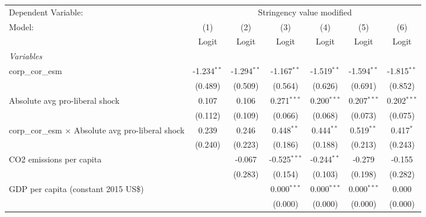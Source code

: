 
\begingroup
\centering
\begin{tabular}{lcccccc}
   \toprule
   Dependent Variable: & \multicolumn{6}{c}{Stringency value modified}\\
   Model:                                                    & (1)           & (2)           & (3)            & (4)           & (5)           & (6)\\  
                                                             &  Logit        & Logit         & Logit          & Logit         & Logit         & Logit\\  
   \midrule
   \emph{Variables}\\
   corp\_cor\_esm                                            & -1.234$^{**}$ & -1.294$^{**}$ & -1.167$^{**}$  & -1.519$^{**}$ & -1.594$^{**}$ & -1.815$^{**}$\\   
                                                             & (0.489)       & (0.509)       & (0.564)        & (0.626)       & (0.691)       & (0.852)\\   
   Absolute avg pro-liberal shock                            & 0.107         & 0.106         & 0.271$^{***}$  & 0.200$^{***}$ & 0.207$^{***}$ & 0.202$^{***}$\\   
                                                             & (0.112)       & (0.109)       & (0.066)        & (0.068)       & (0.073)       & (0.075)\\   
   corp\_cor\_esm $\times$ Absolute avg pro-liberal shock    & 0.239         & 0.246         & 0.448$^{**}$   & 0.444$^{**}$  & 0.519$^{**}$  & 0.417$^{*}$\\   
                                                             & (0.240)       & (0.223)       & (0.186)        & (0.188)       & (0.213)       & (0.243)\\   
   CO2 emissions per capita                                  &               & -0.067        & -0.525$^{***}$ & -0.244$^{**}$ & -0.279        & -0.155\\   
                                                             &               & (0.283)       & (0.154)        & (0.103)       & (0.198)       & (0.282)\\   
   GDP per capita (constant 2015 US\$)                       &               &               & 0.000$^{***}$  & 0.000$^{***}$ & 0.000$^{***}$ & 0.000\\   
                                                             &               &               & (0.000)        & (0.000)       & (0.000)       & (0.000)\\   

\end{tabular}
